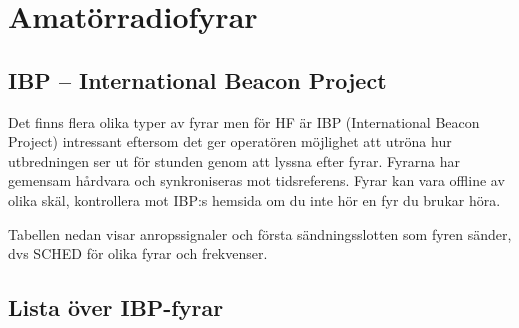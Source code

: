 \section{Amatörradiofyrar}

\subsection{IBP -- International Beacon Project}

Det finns flera olika typer av fyrar men för HF är IBP (International Beacon
Project) intressant eftersom det ger operatören möjlighet att utröna hur
utbredningen ser ut för stunden genom att lyssna efter fyrar. Fyrarna har
gemensam hårdvara och synkroniseras mot tidsreferens. Fyrar kan vara offline
av olika skäl, kontrollera mot IBP:s hemsida om du inte hör en fyr du brukar
höra.

Tabellen nedan visar anropssignaler och första sändningsslotten som fyren
sänder, dvs SCHED för olika fyrar och frekvenser.

\subsection{Lista över IBP-fyrar}

